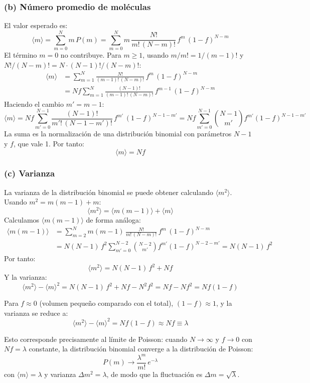 \documentclass[a4paper]{article}
\begin{document}
\subsubsection{(b) Número promedio de moléculas}

El valor esperado es:
$$
\langle m \rangle = \sum_{m=0}^{N} m\, P(m) = \sum_{m=0}^{N} m\, \frac{N!}{m!\,(N-m)!}\, f^m\, (1-f)^{N-m}
$$
El término $m=0$ no contribuye. Para $m \geq 1$, usando $m/m! = 1/(m-1)!$ y $N!/(N-m)! = N \cdot (N-1)!/(N-m)!$:
\begin{align*}
\langle m \rangle &= \sum_{m=1}^{N} \frac{N!}{(m-1)!\,(N-m)!}\, f^m\, (1-f)^{N-m} \\
&= Nf \sum_{m=1}^{N} \frac{(N-1)!}{(m-1)!\,(N-m)!}\, f^{m-1}\, (1-f)^{N-m}
\end{align*}
Haciendo el cambio $m' = m - 1$:
$$
\langle m \rangle = Nf \sum_{m'=0}^{N-1} \frac{(N-1)!}{m'!\,(N-1-m')!}\, f^{m'}\, (1-f)^{N-1-m'} = Nf \sum_{m'=0}^{N-1} \binom{N-1}{m'} f^{m'} (1-f)^{N-1-m'}
$$
La suma es la normalización de una distribución binomial con parámetros $N-1$ y $f$, que vale 1. Por tanto:
$$
\boxed{\langle m \rangle = Nf}
$$

\subsubsection{(c) Varianza}

La varianza de la distribución binomial se puede obtener calculando $\langle m^2 \rangle$. Usando $m^2 = m(m-1) + m$:
$$
\langle m^2 \rangle = \langle m(m-1) \rangle + \langle m \rangle
$$
Calculamos $\langle m(m-1) \rangle$ de forma análoga:
\begin{align*}
\langle m(m-1) \rangle &= \sum_{m=2}^{N} m(m-1)\, \frac{N!}{m!\,(N-m)!}\, f^m\, (1-f)^{N-m} \\
&= N(N-1)\,f^2 \sum_{m'=0}^{N-2} \binom{N-2}{m'} f^{m'} (1-f)^{N-2-m'} = N(N-1)\,f^2
\end{align*}
Por tanto:
$$
\langle m^2 \rangle = N(N-1)\,f^2 + Nf
$$
Y la varianza:
$$
\langle m^2 \rangle - \langle m \rangle^2 = N(N-1)\,f^2 + Nf - N^2 f^2 = Nf - Nf^2 = Nf(1-f)
$$

Para $f \approx 0$ (volumen pequeño comparado con el total), $(1-f) \approx 1$, y la varianza se reduce a:
$$
\boxed{\langle m^2 \rangle - \langle m \rangle^2 = Nf(1-f) \approx Nf \equiv \lambda}
$$

Esto corresponde precisamente al límite de Poisson: cuando $N \to \infty$ y $f \to 0$ con $Nf = \lambda$ constante, la distribución binomial converge a la distribución de Poisson:
$$
P(m) \longrightarrow \frac{\lambda^m}{m!}\, e^{-\lambda}
$$
con $\langle m \rangle = \lambda$ y varianza $\Delta m^2 = \lambda$, de modo que la fluctuación es $\Delta m = \sqrt{\lambda}$.
\end{document}
